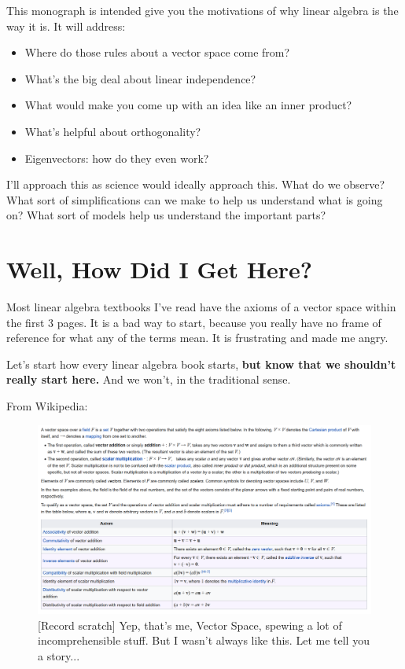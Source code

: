 \documentclass[
]{book}
\providecommand{\tightlist}{%
  \setlength{\itemsep}{0pt}\setlength{\parskip}{0pt}}
\begin{document}
This monograph is intended give you the motivations of why linear algebra is the way it is. It will address:

\begin{itemize}
\tightlist
\item
  Where do those rules about a vector space come from?
\item
  What's the big deal about linear independence?
\item
  What would make you come up with an idea like an inner product?
\item
  What's helpful about orthogonality?
\item
  Eigenvectors: how do they even work?
\end{itemize}

I'll approach this as science would ideally approach this. What do we observe? What sort of simplifications can we make to help us understand what is going on? What sort of models help us understand the important parts?

\hypertarget{well-how-did-i-get-here}{%
\chapter{Well, How Did I Get Here?}\label{well-how-did-i-get-here}}

Most linear algebra textbooks I've read have the axioms of a vector space within the first 3 pages. It is a bad way to start, because you really have no frame of reference for what any of the terms mean. It is frustrating and made me angry.

Let's start how every linear algebra book starts, \textbf{but know that we shouldn't really start here.} And we won't, in the traditional sense.

From Wikipedia:

\begin{figure}

{\centering \includegraphics[width=1\linewidth,height=1\textheight]{images/vector-space-axioms-wikipedia_2} 

}

\caption{[Record scratch]  Yep, that's me, Vector Space, spewing a lot of incomprehensible stuff.  But I wasn't always like this.  Let me tell you a story...}\label{fig:unnamed-chunk-1}
\end{figure}
\end{document}
